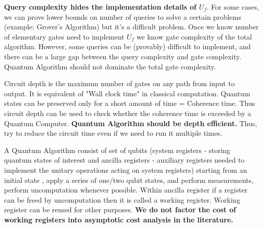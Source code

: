 \documentclass[12pt, oneside]{book}
\theoremstyle{definition}
\theoremstyle{definition}
\theoremstyle{remark}
\begin{document}
\textbf{Query complexity hides the implementation details of $U_f$}. For some cases, we can prove lower bounds on number of queries to solve a certain problems (example: Grover's Algorithm) but it's 
a difficult problem.
Once we know number of elementary gates need to implement $U_f$ we know gate complexity of the total algorithm.
However, some queries can be (provably) difficult to implement, and there can be a large gap between the query complexity and gate
complexity.  Quantum Algorithm should not dominate the total gate complexity. 

Circuit depth is the maximum number of gates on any path from input to output. It is equivalent of "Wall clock time" 
in classical computation. Quantum states can be preserved only for a short amount of time = Coherence time.
Thus circuit depth can be used to check whether the coherence time is exceeded by a Quantum Computer.
\textbf{Quantum Algorithm should be depth efficient.} Thus, try to reduce the circuit time even if we need to run it multiple times.

A Quantum Algorithm consist of set of qubits (system registers - storing quantum states of interest and ancilla registers - 
auxiliary registers needed to implement the unitary operations acting on system registers) starting from an initial state
, apply a series of one/two qubit states, and perform measurements, perform uncomputation whenever possible. 
Within ancilla register if a register can be freed by uncomputation then it is called a working register. Working register can be 
reused for other purposes. \textbf{We do not factor the cost of working registers into asymptotic cost analysis in the literature.}
\end{document}
